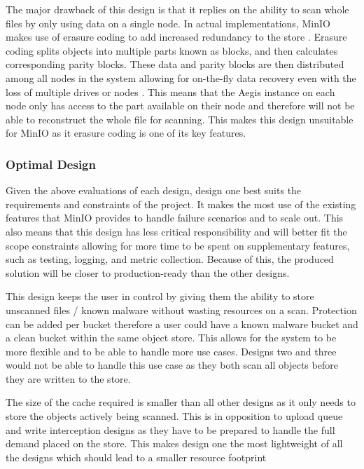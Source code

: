 \documentclass[12pt, conference, final, a4paper, onecolumn, compsoc]{IEEEtran}
\begin{document}
    The major drawback of this design is that it replies on the ability to scan
    whole files by only using data on a single node. In actual implementations,
    MinIO makes use of erasure coding to add increased redundancy to the store
    \citep{minio-erasure}. Erasure coding splits objects into multiple parts
    known as blocks, and then calculates corresponding parity blocks. These data
    and parity blocks are then distributed among all nodes in the system
    allowing for on-the-fly data recovery even with the loss of multiple drives
    or nodes . This means that the Aegis instance on each node only has access
    to the part available on their node and therefore will not be able to
    reconstruct the whole file for scanning. This makes this design unsuitable
    for MinIO as it erasure coding is one of its key features.


    \subsubsection*{Optimal Design}


    Given the above evaluations of each design, design one best suits the
    requirements and constraints of the project. It makes the most use of the
    existing features that MinIO provides to handle failure scenarios and to
    scale out. This also means that this design has less critical responsibility
    and will better fit the scope constraints allowing for more time to be spent
    on supplementary features, such as testing, logging, and metric collection.
    Because of this, the produced solution will be closer to production-ready
    than the other designs.

    This design keeps the user in control by giving them the ability to store
    unscanned files / known malware without wasting resources on a scan.
    Protection can be added per bucket therefore a user could have a known
    malware bucket and a clean bucket within the same object store. This allows
    for the system to be more flexible and to be able to handle more use cases.
    Designs two and three would not be able to handle this use case as they both
    scan all objects before they are written to the store.

    The size of the cache required is smaller than all other designs as it only
    needs to store the objects actively being scanned. This is in opposition to
    upload queue and write interception designs as they have to be prepared to
    handle the full demand placed on the store. This makes design one the most
    lightweight of all the designs which should lead to a smaller resource
    footprint
\end{document}
